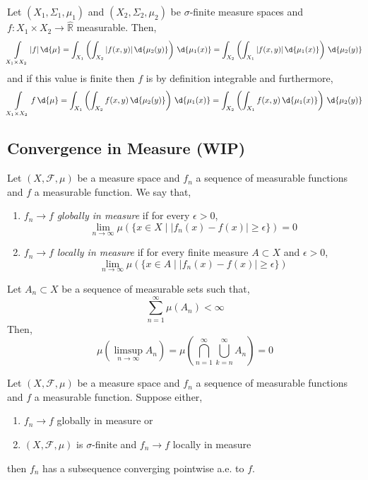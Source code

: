 \documentclass[12pt]{article}
\newcommand{\R}{\mathbb{R}}
\renewcommand{\F}{\mathcal{F}}
\begin{document}
\begin{thm}[Fubini]
Let $(X_1, \Sigma_1, \mu_1)$ and $(X_2, \Sigma_2, \mu_2)$ be $\sigma$-finite measure spaces and $f : X_1 \times X_2 \to \hat{\R}$ measurable. Then,
\[ \int\limits_{X_1 \times X_2} |f| \, \d{\mu} = \int_{X_1} \left( \int_{X_2} |f(x,y)| \, \d{\mu_2(y)} \right) \, \d{\mu_1(x)} = \int_{X_2} \left( \int_{X_1} |f(x,y)| \, \d{\mu_1(x)} \right) \, \d{\mu_2(y)} \]
and if this value is finite then $f$ is by definition integrable and furthermore,
\[ \int\limits_{X_1 \times X_2} f \, \d{\mu} = \int_{X_1} \left( \int_{X_2} f(x,y) \, \d{\mu_2(y)} \right) \, \d{\mu_1(x)} = \int_{X_2} \left( \int_{X_1} f(x,y) \, \d{\mu_1(x)} \right) \, \d{\mu_2(y)} \]
\end{thm}

\subsection{Convergence in Measure (WIP)}

\begin{defn}
Let $(X, \F, \mu)$ be a measure space and $f_n$ a sequence of measurable functions and $f$ a measurable function. We say that,
\begin{enumerate}
\item $f_n \to f$ \textit{globally in measure} if for every $\epsilon > 0$,
\[ \lim_{n \to \infty} \mu(\{ x \in X \mid |f_n(x) - f(x)| \ge \epsilon \}) = 0 \]
\item $f_n \to f$ \textit{locally in measure} if for every finite measure $A \subset X$ and $\epsilon > 0$,
\[ \lim_{n \to \infty} \mu(\{ x \in A \mid |f_n(x) - f(x) | \ge \epsilon \}) \]
\end{enumerate}
\end{defn}

\begin{thm}
Let $A_n \subset X$ be a sequence of measurable sets such that,
\[ \sum_{n = 1}^\infty \mu(A_n) < \infty \]
Then,
\[ \mu \left( \limsup_{n \to \infty} A_n \right) = \mu \left( \bigcap_{n = 1}^\infty \bigcup_{k = n}^\infty A_n \right) = 0 \]
\end{thm}

\begin{prop}
Let $(X, \F, \mu)$ be a measure space and $f_n$ a sequence of measurable functions and $f$ a measurable function. Suppose either,
\begin{enumerate}
\item $f_n \to f$ globally in measure or
\item $(X, \F, \mu)$ is $\sigma$-finite and $f_n \to f$ locally in measure
\end{enumerate}
then $f_n$ has a subsequence converging pointwise a.e. to $f$.
\end{prop}
\end{document}
